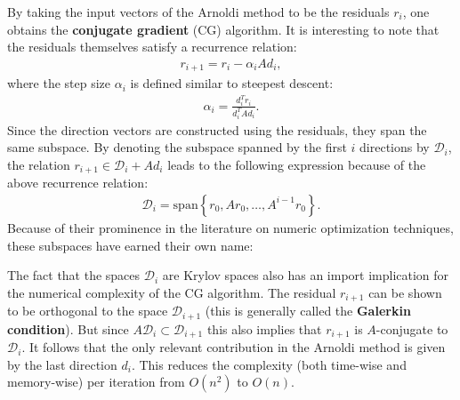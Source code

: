     By taking the input vectors of the Arnoldi method to be the residuals $r_i$, one obtains the \textbf{conjugate gradient} (CG) algorithm. It is interesting to note that the residuals themselves satisfy a recurrence relation:
    \begin{gather}
        r_{i+1} = r_i - \alpha_iAd_i,
    \end{gather}
    where the step size $\alpha_i$ is defined similar to steepest descent:
    \begin{gather}
        \alpha_i = \frac{d_i^Tr_i}{d_i^TAd_i}.
    \end{gather}
    Since the direction vectors are constructed using the residuals, they span the same subspace. By denoting the subspace spanned by the first $i$ directions by $\mathcal{D}_i$, the relation $r_{i+1}\in\mathcal{D}_i+Ad_i$ leads to the following expression because of the above recurrence relation:
    \begin{gather}
        \mathcal{D}_i = \text{span}\left\{r_0,Ar_0,\ldots,A^{i-1}r_0\right\}.
    \end{gather}
    Because of their prominence in the literature on numeric optimization techniques, these subspaces have earned their own name:

    The fact that the spaces $\mathcal{D}_i$ are Krylov spaces also has an import implication for the numerical complexity of the CG algorithm. The residual $r_{i+1}$ can be shown to be orthogonal to the space $\mathcal{D}_{i+1}$ (this is generally called the \textbf{Galerkin condition}). But since $A\mathcal{D}_i\subset\mathcal{D}_{i+1}$ this also implies that $r_{i+1}$ is $A$-conjugate to $\mathcal{D}_i$. It follows that the only relevant contribution in the Arnoldi method is given by the last direction $d_i$. This reduces the complexity (both time-wise and memory-wise) per iteration from $O(n^2)$ to $O(n)$.

